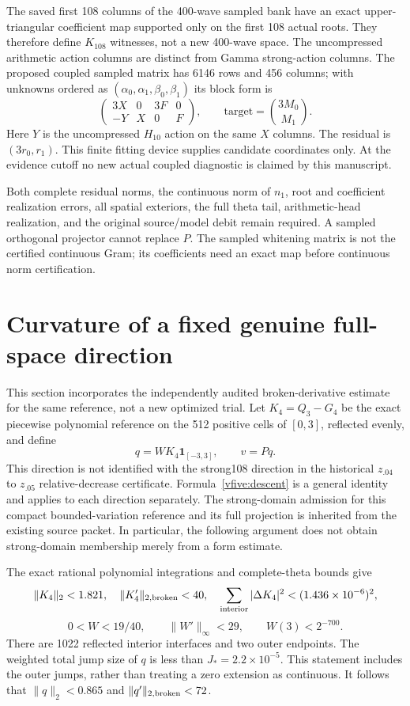 \documentclass[11pt,a4paper]{article}
\numberwithin{equation}{section}
\theoremstyle{definition}\newtheorem{definition}[theorem]{Definition}
\theoremstyle{remark}\newtheorem{remark}[theorem]{Remark}
\begin{document}
The saved first 108 columns of the 400-wave sampled bank have an exact upper-triangular coefficient map supported only on the first 108 actual roots. They therefore define $K_{108}$ witnesses, not a new 400-wave space. The uncompressed arithmetic action columns are distinct from Gamma strong-action columns. The proposed coupled sampled matrix has 6146 rows and 456 columns; with unknowns ordered as $(\alpha_0,\alpha_1,\beta_0,\beta_1)$ its block form is
\[
 \begin{pmatrix}3X&0&3F&0\\-Y&X&0&F\end{pmatrix},
 \qquad \text{target}=\binom{3M_0}{M_1}.
\]
Here $Y$ is the uncompressed $H_{10}$ action on the same $X$ columns. The residual is $(3r_0,r_1)$. This finite fitting device supplies candidate coordinates only. At the evidence cutoff no new actual coupled diagnostic is claimed by this manuscript.

Both complete residual norms, the continuous norm of $n_1$, root and coefficient realization errors, all spatial exteriors, the full theta tail, arithmetic-head realization, and the original source/model debit remain required. A sampled orthogonal projector cannot replace $P$. The sampled whitening matrix is not the certified continuous Gram; its coefficients need an exact map before continuous norm certification.

\section{Curvature of a fixed genuine full-space direction}\label{vfive:curvature}
This section incorporates the independently audited broken-derivative estimate for the same reference, not a new optimized trial. Let $K_4=Q_3-G_4$ be the exact piecewise polynomial reference on the 512 positive cells of $[0,3]$, reflected evenly, and define
\[
 q=W K_4\mathbf1_{[-3,3]},\qquad v=Pq.
\]
This direction is not identified with the strong108 direction in the historical $z_{.04}$ to $z_{.05}$ relative-decrease certificate. Formula~\eqref{vfive:descent} is a general identity and applies to each direction separately. The strong-domain admission for this compact bounded-variation reference and its full projection is inherited from the existing source packet. In particular, the following argument does not obtain strong-domain membership merely from a form estimate.

The exact rational polynomial integrations and complete-theta bounds give
\[
 \|K_4\|_2<1.821,\quad\|K'_4\|_{2,\rm broken}<40,
 \quad\sum_{\rm interior}|\Delta K_4|^2<(1.436\times10^{-6})^2,
\]
\[
 0<W<19/40,\qquad\|W'\|_\infty<29,
 \qquad W(3)<2^{-700}.
\]
There are 1022 reflected interior interfaces and two outer endpoints. The weighted total jump size of $q$ is less than $J_*=2.2\times10^{-5}$. This statement includes the outer jumps, rather than treating a zero extension as continuous. It follows that $\|q\|_2<0.865$ and $\|q'\|_{2,\rm broken}<72$.
\end{document}
